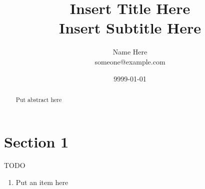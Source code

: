 \documentclass[letterpaper,10pt,twocolumn]{article}
\title{Insert Title Here\\
Insert Subtitle Here\\
}
\author{
  Name Here\\
  someone@example.com\\
}
\date{9999-01-01}
\begin{document}
\maketitle

\begin{abstract}
\large\selectfont
Put abstract here
\\
\end{abstract}

\twocolumngrid

\section{Section 1}

TODO \cite{rfc2324}

\begin{enumerate}[1)]

\item Put an item here

\end{enumerate}

\pagebreak

\onecolumngrid



\end{document}
